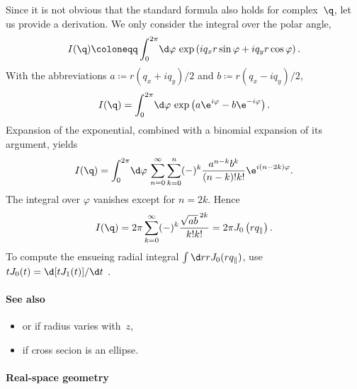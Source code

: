 Since it is not obvious that the standard formula also holds for complex~$\q$,
let us provide a derivation. We only consider the integral over the polar angle,
\begin{equation}
  I(\q) \coloneqq \int_0^{2\pi}\!\d\varphi\,\exp\left(iq_xr\sin\varphi+iq_yr\cos\varphi\right).
\end{equation}
With the abbreviations $a\coloneqq r(q_x+iq_y)/2$ and $b\coloneqq r(q_x-iq_y)/2$,
\begin{equation}
  I(\q) = \int_0^{2\pi}\!\d\varphi\,\exp\left(a\e^{i\varphi}-b\e^{-i\varphi}\right).
\end{equation}
Expansion of the exponential, combined with a binomial expansion of its argument, yields
\begin{equation}
  I(\q)
  = \int_0^{2\pi}\!\d\varphi\,
  \sum_{n=0}^\infty\sum_{k=0}^n(-)^k\frac{a^{n-k}b^{k}}{(n-k)!k!}\e^{i(n-2k)\varphi}.
\end{equation}
The integral over $\varphi$ vanishes except for $n=2k$. Hence
\begin{equation}
  I(\q)
  = 2\pi \sum_{k=0}^\infty(-)^k\frac{{\sqrt{ab}\,}^{2k}}{k!k!}
  = 2\pi J_0\left(rq_\parallel\right).
\end{equation}
To compute the ensueing radial integral $\int \d r r J_0(rq_\parallel)$,
use $t J_0(t)= \d[t J_1(t)]/\d t$ \cite[Formula~9.1.30a]{AbSt64}.

\paragraph{See also}
\begin{itemize}
\item {} or  if radius varies with~$z$,
\item {} if cross secion is an ellipse.
\end{itemize}


 \label{SDodecahedron}

\paragraph{Real-space geometry}\strut\\

